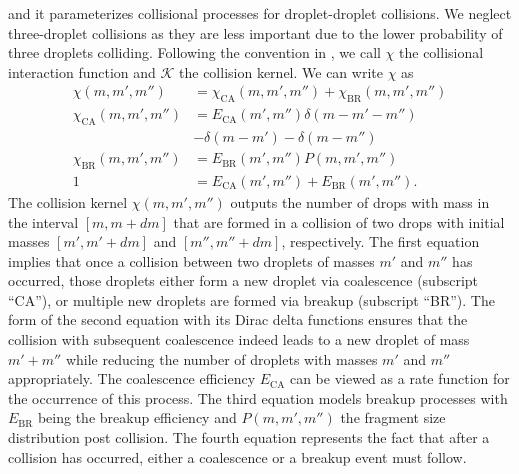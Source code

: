 \documentclass{report}
\begin{document}
and it parameterizes collisional processes for droplet-droplet collisions. We neglect three-droplet collisions as they are less important due to the lower probability of three droplets colliding. Following the convention in \citep{Beheng10}, we call $\chi$ the collisional interaction function and $\mathcal{K}$ the collision kernel. We can write $\chi$ as
\begin{subequations}\label{eq:collisional_interaction_function}
\begin{align}
    \chi(m,m',m'') &= \chi_\mathrm{CA}(m,m',m'')  + \chi_\mathrm{BR}(m,m',m'')\\
    \chi_\mathrm{CA}(m,m',m'') &= E_\mathrm{CA}(m',m'')\delta(m-m'-m'')\\
    \nonumber &- \delta(m-m') - \delta(m-m'')\\
    \chi_\mathrm{BR}(m,m',m'') &= E_\mathrm{BR}(m',m'')P(m,m',m'')\\
    1 &= E_\mathrm{CA}(m',m'') + E_\mathrm{BR}(m',m'').
\end{align}
\end{subequations}
The collision kernel $\chi(m,m',m'')$ outputs the number of drops with mass in the interval $[m, m+dm]$ that are formed in a collision of two drops with initial masses $[m', m'+dm]$ and $[m'', m''+dm]$, respectively. The first equation implies that once a collision between two droplets of masses $m'$ and $m''$ has occurred, those droplets either form a new droplet via coalescence (subscript ``CA''), or multiple new droplets are formed via breakup (subscript ``BR''). The form of the second equation with its Dirac delta functions ensures that the collision with subsequent coalescence indeed leads to a new droplet of mass $m' + m''$ while reducing the number of droplets with masses $m'$ and $m''$ appropriately. The coalescence efficiency $E_\mathrm{CA}$ can be viewed as a rate function for the occurrence of this process. The third equation models breakup processes with $E_\mathrm{BR}$ being the breakup efficiency and $P(m, m', m'')$ the fragment size distribution post collision. The fourth equation represents the fact that after a collision has occurred, either a coalescence or a breakup event must follow. %
\end{document}
